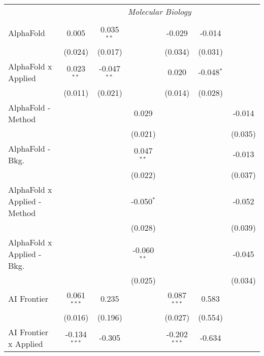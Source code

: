 \begin{tabular}{lcccccc}
 & \multicolumn{6}{c}{\textit{Molecular Biology}} \\ \\
   AlphaFold                      & 0.005          & 0.035$^{**}$  &               & -0.029         & -0.014       &   \\   
                                  & (0.024)        & (0.017)       &               & (0.034)        & (0.031)      &   \\   
   AlphaFold x Applied            & 0.023$^{**}$   & -0.047$^{**}$ &               & 0.020          & -0.048$^{*}$ &   \\   
                                  & (0.011)        & (0.021)       &               & (0.014)        & (0.028)      &   \\   
   AlphaFold - Method             &                &               & 0.029         &                &              & -0.014\\   
                                  &                &               & (0.021)       &                &              & (0.035)\\   
   AlphaFold - Bkg.               &                &               & 0.047$^{**}$  &                &              & -0.013\\   
                                  &                &               & (0.022)       &                &              & (0.037)\\   
   AlphaFold x Applied - Method   &                &               & -0.050$^{*}$  &                &              & -0.052\\   
                                  &                &               & (0.028)       &                &              & (0.039)\\   
   AlphaFold x Applied - Bkg.     &                &               & -0.060$^{**}$ &                &              & -0.045\\   
                                  &                &               & (0.025)       &                &              & (0.034)\\   
   AI Frontier                    & 0.061$^{***}$  & 0.235         &               & 0.087$^{***}$  & 0.583        &   \\   
                                  & (0.016)        & (0.196)       &               & (0.027)        & (0.554)      &   \\   
   AI Frontier x Applied          & -0.134$^{***}$ & -0.305        &               & -0.202$^{***}$ & -0.634       &   \\   

\end{tabular}
